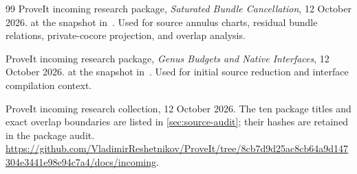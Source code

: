\begin{thebibliography}{99}
ProveIt incoming research package,
\emph{Saturated Bundle Cancellation}, 12 October 2026.
at the snapshot in~\cite{repo}. Used for source annulus charts, residual
bundle relations, private-cocore projection, and overlap analysis.

ProveIt incoming research package,
\emph{Genus Budgets and Native Interfaces}, 12 October 2026.
at the snapshot in~\cite{repo}. Used for initial source reduction and
interface compilation context.

ProveIt incoming research collection, 12 October 2026.
The ten package titles and exact overlap boundaries are listed in
\cref{sec:source-audit}; their hashes are retained in the package audit.
\url{https://github.com/VladimirReshetnikov/ProveIt/tree/8cb7d9d25ac8cb64a9d147304e3441e98e94c7a4/docs/incoming}.

\end{thebibliography}
